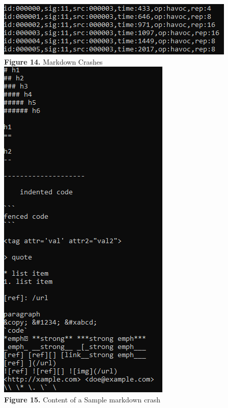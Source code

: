 \documentclass[12pt]{diazessay}
\begin{document}
\begin{center}
	\includegraphics[scale=1.0]{markdowncrashes.png}\\
	\textbf{Figure 14.} Markdown Crashes\\
\vspace{6mm}	
	\includegraphics[scale=1.0]{markdownsamplecatcrash.png}\\
	\textbf{Figure 15.} Content of a Sample markdown crash\\
\end{center}

\clearpage



\end{document}
